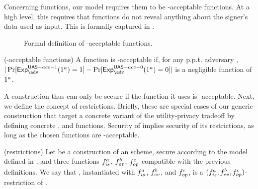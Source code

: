 Concerning \fissue functions, our \UAS model requires them to be \UAS-acceptable
functions. At a high level, this requires that \fissue functions do not reveal
anything about the signer's data used as input. This is formally captured in
.

\begin{figure}[ht!]
  \centering  
  \label{fig:uas-acceptable}
  \caption{Formal definition of \UAS-acceptable \fissue functions.}
\end{figure}

\begin{definition}{(\UAS-acceptable \fissue functions)}
  \label{def:uas-acc-func}
  A \fissue function is \UAS-acceptable if, for any p.p.t. adversary \adv,
  $|\Pr[\Exp^{\UAS-acc-1}_\adv(1^\secpar)=1]-\Pr[\Exp^{\UAS-acc-0}_\adv
  (1^\secpar)=0]|$ is a negligible function of $1^\kappa$.
\end{definition}

A \UAS construction thus can only be secure if the \fissue function it uses is
\UAS-acceptable.
%
Next, we define the concept of \CUASGen restrictions. Briefly, these are special
cases of our generic construction that target a concrete variant of the
utility-privacy tradeoff by defining concrete \fissue, \feval and \finsp
functions. Security of \CUASGen implies security of its restrictions, as long as
the chosen \fissue functions are \CUASGen-acceptable.

\begin{definition}{(\CUASGen restrictions)}
  \label{def:uas-restrictions}
  Let \CUASGen be a construction of an \UAS scheme, secure according to
  the model defined in , and three functions $f_{is}^a$,
  $f_{ev}^b$, $f_{op}^c$ compatible with the previous definitions. We say that
  \CUASGen, instantiated with $f_{is}^a$, $f_{ev}^b$, and $f_{op}^c$, is a
  $(f_{is}^a,f_{ev}^b,f_{op}^c)$-restriction of \CUASGen.
\end{definition}

